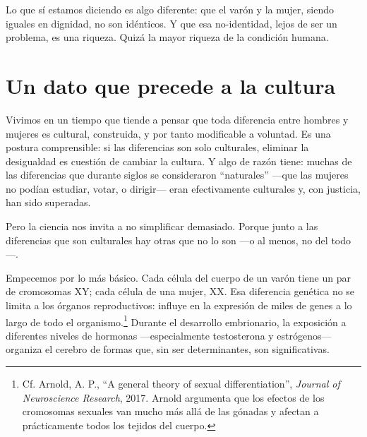 Lo que sí estamos diciendo es algo diferente: que el varón y la mujer, siendo iguales en dignidad, no son idénticos. Y que esa no-identidad, lejos de ser un problema, es una riqueza. Quizá la mayor riqueza de la condición humana.

\section{Un dato que precede a la cultura}

Vivimos en un tiempo que tiende a pensar que toda diferencia entre hombres y mujeres es cultural, construida, y por tanto modificable a voluntad. Es una postura comprensible: si las diferencias son solo culturales, eliminar la desigualdad es cuestión de cambiar la cultura. Y algo de razón tiene: muchas de las diferencias que durante siglos se consideraron ``naturales'' ---que las mujeres no podían estudiar, votar, o dirigir--- eran efectivamente culturales y, con justicia, han sido superadas.

Pero la ciencia nos invita a no simplificar demasiado. Porque junto a las diferencias que son culturales hay otras que no lo son ---o al menos, no del todo---.

Empecemos por lo más básico. Cada célula del cuerpo de un varón tiene un par de cromosomas XY; cada célula de una mujer, XX. Esa diferencia genética no se limita a los órganos reproductivos: influye en la expresión de miles de genes a lo largo de todo el organismo.\footnote{Cf. Arnold, A. P., ``A general theory of sexual differentiation'', \textit{Journal of Neuroscience Research}, 2017. Arnold argumenta que los efectos de los cromosomas sexuales van mucho más allá de las gónadas y afectan a prácticamente todos los tejidos del cuerpo.} Durante el desarrollo embrionario, la exposición a diferentes niveles de hormonas ---especialmente testosterona y estrógenos--- organiza el cerebro de formas que, sin ser determinantes, son significativas.

